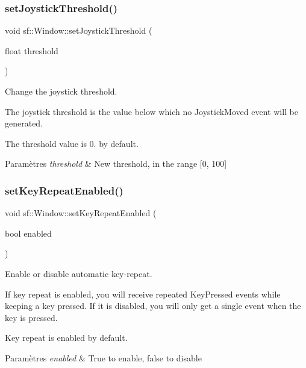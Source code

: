\subsubsection{\texorpdfstring{set\+Joystick\+Threshold()}{setJoystickThreshold()}}
{\footnotesize\ttfamily void sf\+::\+Window\+::set\+Joystick\+Threshold (\begin{DoxyParamCaption}\item[{float}]{threshold }\end{DoxyParamCaption})}



Change the joystick threshold. 

The joystick threshold is the value below which no Joystick\+Moved event will be generated.

The threshold value is 0. by default.


\begin{DoxyParams}{Paramètres}
{\em threshold} & New threshold, in the range \mbox{[}0, 100\mbox{]} \\
\hline
\end{DoxyParams}
\mbox{\label{classsf_1_1Window_aef9f2b14c10ecba8a8df95dd51c5bb73}} 
\subsubsection{\texorpdfstring{set\+Key\+Repeat\+Enabled()}{setKeyRepeatEnabled()}}
{\footnotesize\ttfamily void sf\+::\+Window\+::set\+Key\+Repeat\+Enabled (\begin{DoxyParamCaption}\item[{bool}]{enabled }\end{DoxyParamCaption})}



Enable or disable automatic key-\/repeat. 

If key repeat is enabled, you will receive repeated Key\+Pressed events while keeping a key pressed. If it is disabled, you will only get a single event when the key is pressed.

Key repeat is enabled by default.


\begin{DoxyParams}{Paramètres}
{\em enabled} & True to enable, false to disable \\
\hline
\end{DoxyParams}
\mbox{\label{classsf_1_1Window_aad3991c25e0a83afbb4d62febf9b7b14}} 
